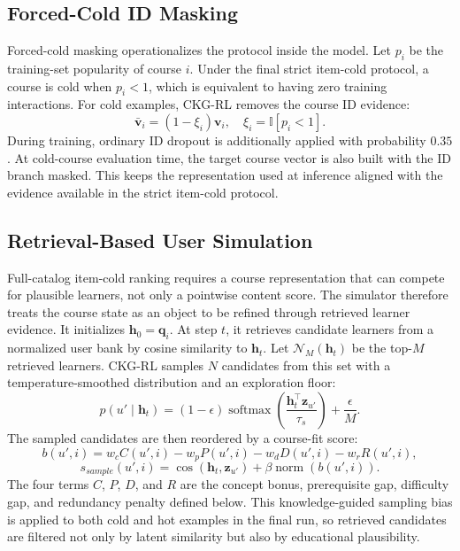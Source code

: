 \documentclass[sigconf,anonymous,review]{acmart}
\begin{document}
\subsection{Forced-Cold ID Masking}
Forced-cold masking operationalizes the protocol inside the model. Let \(p_i\) be the training-set popularity of course \(i\). Under the final strict item-cold protocol, a course is cold when \(p_i<1\), which is equivalent to having zero training interactions. For cold examples, CKG-RL removes the course ID evidence:
\begin{equation}
\bar{\mathbf{v}}_i=(1-\xi_i)\mathbf{v}_i,
\quad
\xi_i=\mathbb{I}[p_i<1].
\end{equation}
During training, ordinary ID dropout is additionally applied with probability \(0.35\). At cold-course evaluation time, the target course vector is also built with the ID branch masked. This keeps the representation used at inference aligned with the evidence available in the strict item-cold protocol.

\subsection{Retrieval-Based User Simulation}
Full-catalog item-cold ranking requires a course representation that can compete for plausible learners, not only a pointwise content score. The simulator therefore treats the course state as an object to be refined through retrieved learner evidence. It initializes \(\mathbf{h}_0=\mathbf{q}_i\). At step \(t\), it retrieves candidate learners from a normalized user bank by cosine similarity to \(\mathbf{h}_t\). Let \(\mathcal{N}_M(\mathbf{h}_t)\) be the top-\(M\) retrieved learners. CKG-RL samples \(N\) candidates from this set with a temperature-smoothed distribution and an exploration floor:
\begin{equation}
p(u'\mid \mathbf{h}_t)=
(1-\epsilon)\operatorname{softmax}
\left(\frac{\mathbf{h}_t^\top\mathbf{z}_{u'}}{\tau_s}\right)
+\frac{\epsilon}{M}.
\end{equation}
The sampled candidates are then reordered by a course-fit score:
\begin{equation}
b(u',i)=
w_c C(u',i)-w_p P(u',i)-w_d D(u',i)-w_r R(u',i),
\end{equation}
\begin{equation}
s_{sample}(u',i)=
\cos(\mathbf{h}_t,\mathbf{z}_{u'})
+\beta\operatorname{norm}(b(u',i)).
\end{equation}
The four terms \(C\), \(P\), \(D\), and \(R\) are the concept bonus, prerequisite gap, difficulty gap, and redundancy penalty defined below. This knowledge-guided sampling bias is applied to both cold and hot examples in the final run, so retrieved candidates are filtered not only by latent similarity but also by educational plausibility.
\end{document}
